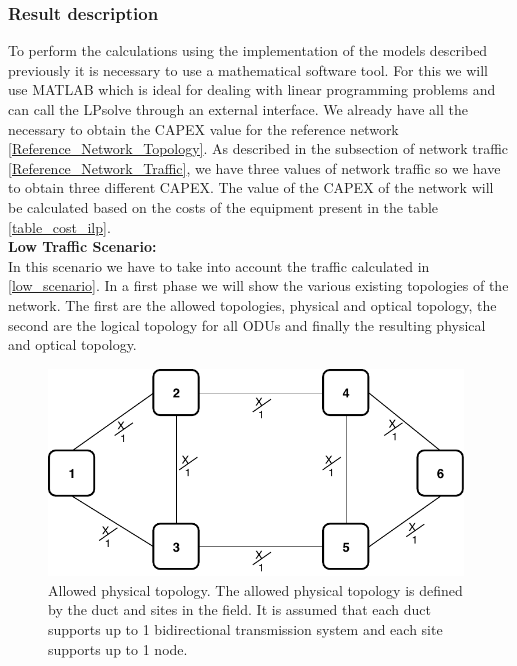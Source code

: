 \subsubsection{Result description}

To perform the calculations using the implementation of the models described previously it is necessary to use a mathematical software tool. For this we will use MATLAB which is ideal for dealing with linear programming problems and can call the LPsolve through an external interface.
We already have all the necessary to obtain the CAPEX value for the reference network \ref{Reference_Network_Topology}. As described in the subsection of network traffic \ref{Reference_Network_Traffic}, we have three values of network traffic so we have to obtain three different CAPEX. The value of the CAPEX of the network will be calculated based on the costs of the equipment present in the table \ref{table_cost_ilp}.\\

\textbf{Low Traffic Scenario:}\\

In this scenario we have to take into account the traffic calculated in \ref{low_scenario}. In a first phase we will show the various existing topologies of the network. The first are the allowed topologies, physical and optical topology, the second are the logical topology for all ODUs and finally the resulting physical and optical topology.

\begin{figure}[h!]
\centering
\includegraphics[width=11cm]{sdf/ilp/translucent_survivability/figures/allowed_physical_topology}
\caption{Allowed physical topology. The allowed physical topology is defined by the duct and sites in the field. It is assumed that each duct supports up to 1 bidirectional transmission system and each site supports up to 1 node.}
\label{allowed3_physical_low}
\end{figure}

